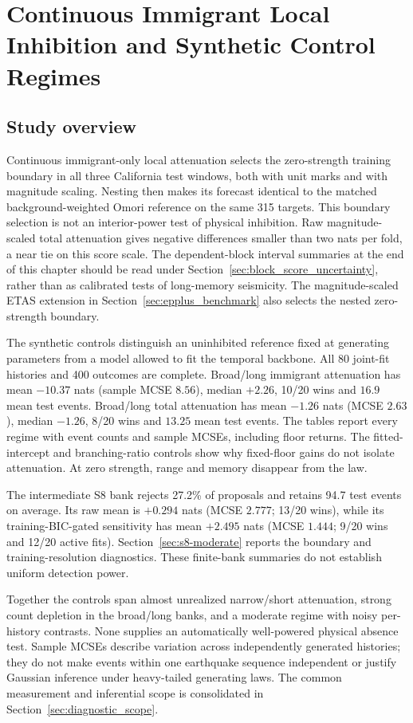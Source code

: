 \chapter{Continuous Immigrant Local Inhibition and Synthetic Control Regimes}
\label{ch:local-inhibition}
\section{Study overview}

Continuous immigrant-only local attenuation selects the zero-strength training boundary in all three California test windows, both with unit marks and with magnitude scaling. Nesting then makes its forecast identical to the matched background-weighted Omori reference on the same 315 targets. This boundary selection is not an interior-power test of physical inhibition. Raw magnitude-scaled total attenuation gives negative differences smaller than two nats per fold, a near tie on this score scale. The dependent-block interval summaries at the end of this chapter should be read under Section~\ref{sec:block_score_uncertainty}, rather than as calibrated tests of long-memory seismicity. The magnitude-scaled ETAS extension in Section~\ref{sec:epplus_benchmark} also selects the nested zero-strength boundary.

The synthetic controls distinguish an uninhibited reference fixed at generating parameters from a model allowed to fit the temporal backbone. All 80 joint-fit histories and 400 outcomes are complete. Broad/long immigrant attenuation has mean $-10.37$ nats (sample MCSE $8.56$), median $+2.26$, 10/20 wins and $16.9$ mean test events. Broad/long total attenuation has mean $-1.26$ nats (MCSE $2.63$), median $-1.26$, 8/20 wins and $13.25$ mean test events. The tables report every regime with event counts and sample MCSEs, including floor returns. The fitted-intercept and branching-ratio controls show why fixed-floor gains do not isolate attenuation. At zero strength, range and memory disappear from the law.

The intermediate S8 bank rejects 27.2\% of proposals and retains 94.7 test events on average. Its raw mean is $+0.294$ nats (MCSE $2.777$; 13/20 wins), while its training-BIC-gated sensitivity has mean $+2.495$ nats (MCSE $1.444$; 9/20 wins and 12/20 active fits). Section~\ref{sec:s8-moderate} reports the boundary and training-resolution diagnostics. These finite-bank summaries do not establish uniform detection power.

Together the controls span almost unrealized narrow/short attenuation, strong
count depletion in the broad/long banks, and a moderate regime with noisy
per-history contrasts. None supplies an automatically well-powered physical
absence test. Sample MCSEs describe variation across independently generated
histories; they do not make events within one earthquake sequence independent
or justify Gaussian inference under heavy-tailed generating laws. The common
measurement and inferential scope is consolidated in
Section~\ref{sec:diagnostic_scope}.

